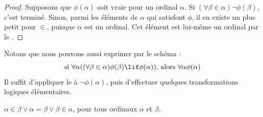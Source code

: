 \documentclass[../../../include/open-logic-section]{subfiles}
\begin{document}
\begin{proof}
Supposons que $\phi(\alpha)$ soit vraie pour un ordinal $\alpha$. Si
$(\forall \beta \in \alpha) \lnot \phi(\beta)$, c'est terminé.
Sinon, parmi les éléments de $\alpha$ qui satisfont $\phi$,
il en existe un plus petit pour $\in$, puisque $\alpha$ est un ordinal.
Cet élément est lui-même un ordinal par le
.
%
%
%
\end{proof}
\noindent
Notons que nous pouvons aussi exprimer 
par le schéma :
\[
\text{si }\forall \alpha((\forall \beta \in \alpha)\phi(\beta) \lif
\phi(\alpha))\text{, alors }\forall \alpha\phi(\alpha)
\]
Il suffit d'appliquer le  à
$\lnot\phi(\alpha)$, puis d'effectuer quelques transformations
logiques élémentaires.

\begin{thm}[Trichotomie]
$\alpha \in \beta \lor \alpha = \beta \lor \beta \in \alpha$, pour
tous ordinaux $\alpha$ et $\beta$.
\end{thm}
\end{document}
